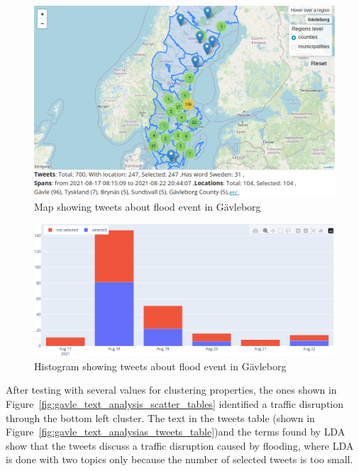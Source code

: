 \begin{figure}[H]
  \begin{center}
    \includegraphics[width=14cm]{./images/gavle_map.png}
  \end{center}
  \caption{Map showing tweets about flood event in Gävleborg}
  \label{fig:gavle_map}
\end{figure}

\begin{figure}[H]
  \begin{center}
    \includegraphics[width=12cm]{./images/gavle_histogram.png}
  \end{center}
  \caption{Histogram showing tweets about flood event in Gävleborg}
  \label{fig:gavle_histogram}
\end{figure}


After testing with several values for clustering properties, the ones shown in
Figure~\ref{fig:gavle_text_analysis_scatter_tables} identified a traffic disruption through the
bottom left cluster. The text in the tweets table (shown in
Figure~\ref{fig:gavle_text_analysias_tweets_table})and the terms found by \ac{LDA} show that the
tweets discuss a traffic disruption caused by flooding, where \ac{LDA} is done with two topics only
because the number of selected tweets is too small.

